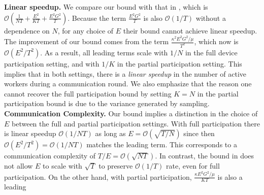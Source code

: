 \begin{comment}
A crucial ingredient in the proof of Theorem~\ref{th:scvx_sgd} is a one step contraction bound 
	\begin{align*}
	\mathbb{E}\|\ov{w}_{t+1}-\vw^{\ast}\|^{2} & \leq(1-\mu\alpha_{t})\mathbb{E}\|\ov{w}_{t}-\vw^{\ast}\|^{2}+\alpha_{t}^{2}\frac{1}{N}\nu_{max}^{2}\sigma^{2}+6E^{2}L\alpha_{t}^{3}G^{2} 
	\end{align*}
that improves upon the analysis in~\cite{li2019convergence} to deliver the linear speedup. Moreover, analogues of this bound appear in the analyses of the convex setting as well as the Nesterov accelerated FedAvg.\\
\end{comment}

\textbf{Linear speedup. }We compare our bound with that in \cite{li2019convergence},
which is $\mathcal{O}(\frac{1}{NT}+\frac{E^{2}}{KT}+\frac{E^{2}G^{2}}{T})$.
Because the term $\frac{E^{2}G^{2}}{T}$ is also $\mathcal{O}(1/T)$
without a dependence on $N$, for any choice of $E$ their bound cannot
achieve linear speedup. The improvement of our bound comes from the
term $\frac{\kappa^{2}E^{2}G^{2}/\mu}{T^{2}}$, which now is $\mathcal{O}(E^{2}/T^{2})$.
As a result, all leading terms scale with $1/N$ in the full device
participation setting, and with $1/K$ in the partial participation
setting. This implies that in both settings, there is a \emph{linear
	speedup} in the number of active workers during a communication
round. We also emphasize that the reason one cannot recover the full participation bound by setting $K=N$ in the partial participation bound is due to the variance generated by sampling.  \\
\textbf{Communication Complexity.} Our bound implies a distinction
in the choice of $E$ between the full and partial participation settings.
With full participation there is linear speedup $\mathcal{O}(1/NT)$
as long as $E=\mathcal{O}(\sqrt{T/N})$ since then $\mathcal{O}(E^{2}/T^{2})=\mathcal{O}(1/NT)$
matches the leading term. This corresponds to a communication complexity
of $T/E=\mathcal{O}(\sqrt{NT})$. In contrast, the bound in \cite{li2019convergence}
does not allow $E$ to scale with $\sqrt{T}$ to preserve $\mathcal{O}(1/T)$
rate, even for full participation. On the other hand, with partial
participation, $\frac{\kappa E^{2}G^{2}/\mu}{KT}$ is also a leading
